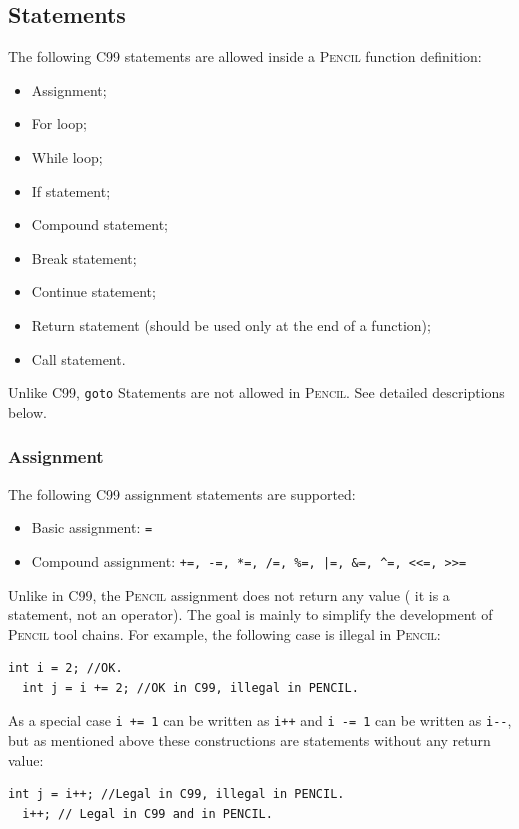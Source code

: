 \documentclass{carp}
\newcommand\pencil{\textsc{Pencil}\xspace}
\newcommand{\C}{C99\xspace}
\begin{document}
\subsection{Statements}
The following \C statements are allowed inside a \pencil function definition:
\begin{itemize}
  \item Assignment;
  \item For loop;
  \item While loop;
  \item If statement;
  \item Compound statement;
  \item Break statement;
  \item Continue statement;
  \item Return statement (should be used only at the end of a function);
  \item Call statement.
\end{itemize}
Unlike \C, \lstinline!goto! Statements are not allowed in \pencil.
See detailed descriptions below.

\subsubsection{Assignment}
\label{sec:assignments}
The following \C assignment statements are supported:
\begin{itemize}
  \item Basic assignment: \lstinline!=!
  \item Compound assignment: \lstinline{+=, -=, *=, /=, %=, |=, &=, ^=, <<=, >>=}
\end{itemize}

Unlike in \C, the \pencil assignment does not return any value (\ie
it is a statement, not an operator).
The goal is mainly to simplify the development of \pencil tool chains.
For example, the following case is illegal in \pencil:
\begin{lstlisting}[language=pencil]
  int i = 2; //OK.
  int j = i += 2; //OK in C99, illegal in PENCIL.
\end{lstlisting}

As a special case \lstinline!i += 1! can be written as \lstinline!i++!
and \lstinline!i -= 1! can be written as \lstinline!i--!, but as mentioned
above these constructions are statements without any return value:

\begin{lstlisting}[language=pencil]
  int j = i++; //Legal in C99, illegal in PENCIL.
  i++; // Legal in C99 and in PENCIL.
\end{lstlisting}
\end{document}
